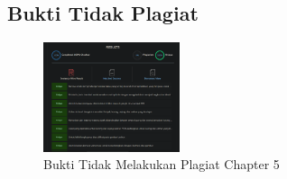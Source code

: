 \subsection{Bukti Tidak Plagiat}
\begin{figure}[H]
\centering
	\includegraphics[width=4cm]{figures/1174073/tugas5/buktiplagiat/1.PNG}
	\caption{Bukti Tidak Melakukan Plagiat Chapter 5}
\end{figure}

